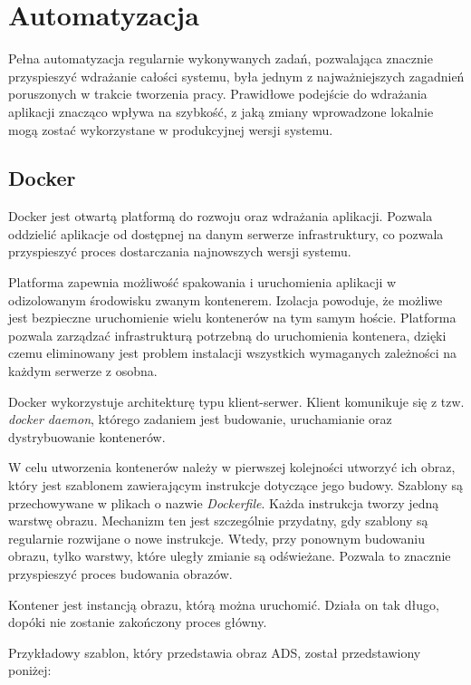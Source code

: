 \newpage
\section{Automatyzacja}

Pełna automatyzacja regularnie wykonywanych zadań, pozwalająca znacznie przyspieszyć 
wdrażanie całości systemu, była jednym z najważniejszych zagadnień poruszonych w 
trakcie tworzenia pracy. Prawidłowe podejście do wdrażania aplikacji znacząco wpływa 
na szybkość, z jaką zmiany wprowadzone lokalnie mogą zostać wykorzystane w 
produkcyjnej wersji systemu. 

\subsection{Docker}

Docker jest otwartą platformą do rozwoju oraz wdrażania aplikacji. Pozwala oddzielić aplikacje od
dostępnej na danym serwerze infrastruktury, co pozwala przyspieszyć proces dostarczania najnowszych
wersji systemu. 

Platforma zapewnia możliwość spakowania i uruchomienia aplikacji w odizolowanym środowisku
zwanym kontenerem. Izolacja powoduje, że możliwe jest bezpieczne uruchomienie wielu kontenerów na tym
samym hoście. Platforma pozwala zarządzać infrastrukturą potrzebną do uruchomienia kontenera, dzięki
czemu eliminowany jest problem instalacji wszystkich wymaganych zależności na każdym serwerze z osobna.

Docker wykorzystuje architekturę typu klient-serwer. Klient komunikuje się z tzw. \textit{docker daemon}, którego
zadaniem jest budowanie, uruchamianie oraz dystrybuowanie kontenerów. 

W celu utworzenia kontenerów należy w pierwszej kolejności utworzyć ich obraz, który jest szablonem
zawierającym instrukcje dotyczące jego budowy. Szablony są przechowywane w plikach o nazwie \textit{Dockerfile}.
Każda instrukcja tworzy jedną warstwę obrazu. Mechanizm ten jest szczególnie przydatny, gdy szablony są
regularnie rozwijane o nowe instrukcje. Wtedy, przy ponownym budowaniu obrazu, tylko warstwy, które
uległy zmianie są odświeżane. Pozwala to znacznie przyspieszyć proces budowania obrazów.

Kontener jest instancją obrazu, którą można uruchomić. Działa on tak długo, dopóki nie zostanie
zakończony proces główny.

Przykładowy szablon, który przedstawia obraz ADS, został przedstawiony poniżej:

